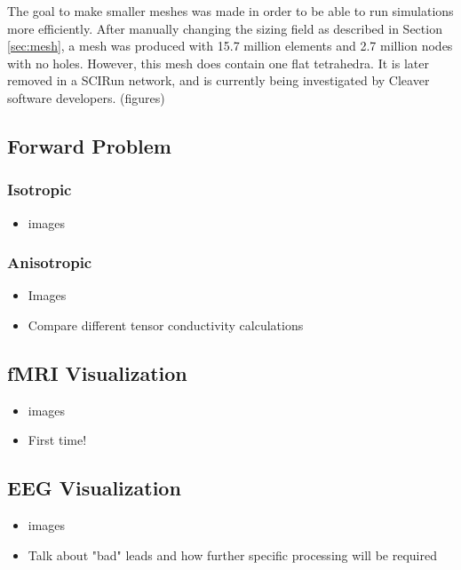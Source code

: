 The goal to make smaller meshes was made in order to be able to run simulations more efficiently. After manually changing the sizing field as described in Section \ref{sec:mesh}, a mesh was produced with 15.7 million elements and 2.7 million nodes with no holes. However, this mesh does contain one flat tetrahedra. It is later removed in a SCIRun network, and is currently being investigated by Cleaver software developers. (figures)

\subsection{Forward Problem}

\subsubsection{Isotropic}

\begin{itemize}

\item images

\end{itemize}

\subsubsection{Anisotropic}

\begin{itemize}

\item Images

\item Compare different tensor conductivity calculations

\end{itemize}

\subsection{fMRI Visualization}

\begin{itemize}

\item  images

\item First time!

\end{itemize}

\subsection{EEG Visualization}

\begin{itemize}

\item  images

\item Talk about "bad" leads and how further specific processing will be required

\end{itemize}




